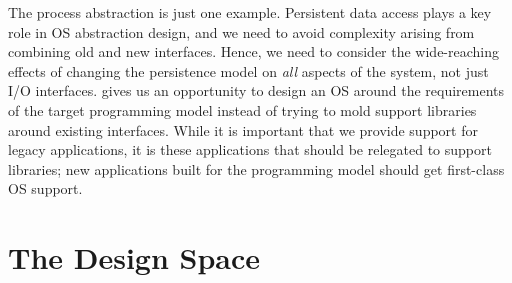 {    %


    The process abstraction is just one example. Persistent data access plays a key role in OS
    abstraction design, and we need to avoid complexity arising from combining old and new interfaces.
    Hence, we need to consider the
    wide-reaching effects of changing the persistence model on \emph{all} aspects of the system, not
    just I/O interfaces. \NVM gives us an opportunity to design an OS around the requirements
    of the target programming model instead of trying to mold support libraries around existing
    interfaces. While it is important that we provide support for legacy applications,
    it is these applications that should be relegated to support libraries; new applications built for
    the programming model should get first-class OS support.
}


\section{The Design Space}





